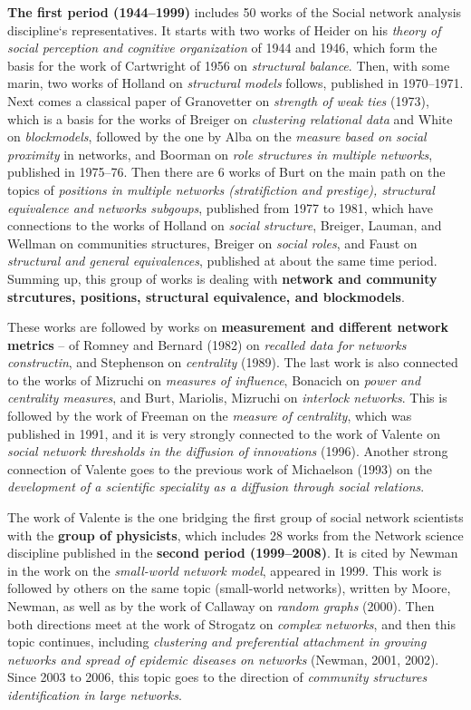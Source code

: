 \documentclass[11pt]{article} %
\begin{document}
\textbf{The first period (1944--1999)} includes 50 works of the Social network analysis discipline`s representatives. It starts with two works of Heider on his \textit{theory of social perception and cognitive organization} of 1944 and 1946, which form the basis for the work of Cartwright of 1956 on \textit{structural balance}. Then, with some marin, two works of Holland on \textit{structural models} follows, published in 1970--1971. Next comes a classical paper of Granovetter on \textit{strength of weak ties} (1973), which is a basis for the works of Breiger on \textit{clustering relational data} and White on \textit{blockmodels}, followed by the one by Alba on the \textit{measure based on social proximity} in networks, and Boorman on \textit{role structures in multiple networks}, published in 1975--76. Then there are 6 works of Burt on the main path on the topics of \textit{positions in multiple networks (stratifiction and prestige), structural equivalence and networks subgoups}, published from 1977 to 1981, which have connections to  the works of Holland on \textit{social structure}, Breiger, Lauman, and Wellman on {communities structures}, Breiger on \textit{social roles}, and Faust on \textit{structural and general equivalences}, published at about the same time period. Summing up, this group of works is dealing with \textbf{network and community strcutures, positions, structural equivalence, and blockmodels}.  \medskip 

These works are followed by works on \textbf{measurement and different network metrics} -- of Romney and Bernard (1982) on \textit{recalled data for networks constructin}, and Stephenson on \textit{centrality} (1989). The last work is also connected to the works of Mizruchi on \textit{measures of influence}, Bonacich on \textit{power and centrality measures}, and Burt, Mariolis, Mizruchi on \textit{interlock networks}. This is followed by the work of Freeman on the \textit{measure of centrality}, which was published in 1991, and it is very strongly connected to the work of Valente on \textit{social network thresholds in the diffusion of innovations} (1996). Another strong connection of Valente goes to the previous work of Michaelson (1993) on the \textit{development of a scientific speciality as a diffusion through social relations}.  \medskip 

The work of Valente is the one bridging the first group of social network scientists with the \textbf{group of physicists}, which includes 28 works from the Network science discipline published in the \textbf{second period (1999--2008)}. It is cited by Newman in the work on the \textit{small-world network model}, appeared in 1999. This work is followed by others on the same topic (small-world networks), written by Moore, Newman, as well as by the work of Callaway on \textit{random graphs} (2000). Then both directions meet at the work of Strogatz on \textit{complex networks}, and then this topic continues, including \textit{clustering and preferential attachment in growing networks and spread of epidemic diseases on networks} (Newman, 2001, 2002). Since 2003 to 2006, this topic goes to the direction of \textit{community structures identification in large networks}. \medskip 
 
\end{document}
